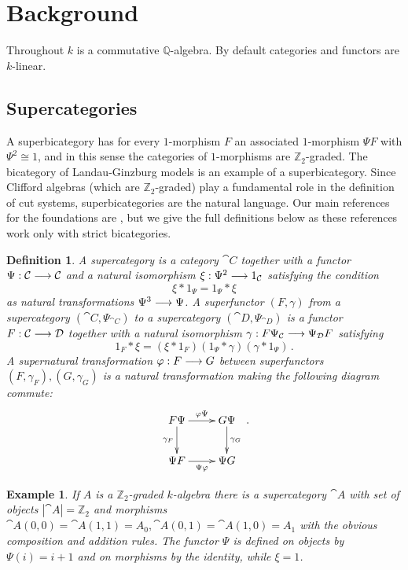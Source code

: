\documentclass[english,letter paper,12pt,leqno]{article}
\theoremstyle{example}
\newtheorem{definition}[theorem]{Definition}
\newtheorem{example}[theorem]{Example}
\numberwithin{equation}{section}
\begin{document}
\section{Background}\label{section:background}

Throughout $k$ is a commutative $\mathbb{Q}$-algebra. By default categories and functors are $k$-linear.

\subsection{Supercategories}

A superbicategory has for every $1$-morphism $F$ an associated $1$-morphism $\Psi F$ with $\Psi^2 \cong 1$, and in this sense the categories of $1$-morphisms are $\mathbb{Z}_2$-graded. The bicategory of Landau-Ginzburg models is an example of a superbicategory. Since Clifford algebras (which are $\mathbb{Z}_2$-graded) play a fundamental role in the definition of cut systems, superbicategories are the natural language. Our main references for the foundations are \cite{ellis_lauda,kang,kang2}, but we give the full definitions below as these references work only with strict bicategories.

\begin{definition} A \emph{supercategory} is a category $\cat{C}$ together with a functor $\Psi: \mathcal{C} \longrightarrow \mathcal{C}$ and a natural isomorphism $\xi: \Psi^2 \longrightarrow 1_{\mathcal{C}}$ satisfying the condition
\[
\xi * 1_{\Psi} = 1_{\Psi} * \xi
\]
as natural transformations $\Psi^3 \longrightarrow \Psi$. A \emph{superfunctor} $(F, \gamma)$ from a supercategory $(\cat{C}, \Psi_{\cat{C}})$ to a supercategory $(\cat{D}, \Psi_{\cat{D}})$ is a functor $F: \mathcal{C} \longrightarrow \mathcal{D}$ together with a natural isomorphism $\gamma: F \Psi_{\mathcal{C}} \longrightarrow \Psi_{\mathcal{D}} F$ satisfying
\[
1_F * \xi = (\xi * 1_F ) ( 1_{\Psi} * \gamma ) ( \gamma * 1_{\Psi} )\,.
\]
A \emph{supernatural transformation} $\varphi: F \longrightarrow G$ between superfunctors $(F,\gamma_F), (G,\gamma_G)$ is a natural transformation making the following diagram commute:
\[
\xymatrix{
F \Psi \ar[r]^-{\varphi \Psi}\ar[d]_-{\gamma_F} & G \Psi \ar[d]^-{\gamma_G}\\
\Psi F \ar[r]_-{\Psi \varphi} & \Psi G
}\,.
\] 
\end{definition}

\begin{example}\label{example:Aassup} If $A$ is a $\mathbb{Z}_2$-graded $k$-algebra there is a supercategory $\cat{A}$ with set of objects $|\cat{A}| = \mathbb{Z}_2$ and morphisms $\cat{A}(0,0) = \cat{A}(1,1) = A_0, \cat{A}(0,1) = \cat{A}(1,0) = A_1$ with the obvious composition and addition rules. The functor $\Psi$ is defined on objects by $\Psi(i) = i+1$ and on morphisms by the identity, while $\xi = 1$.
\end{example}
\end{document}
